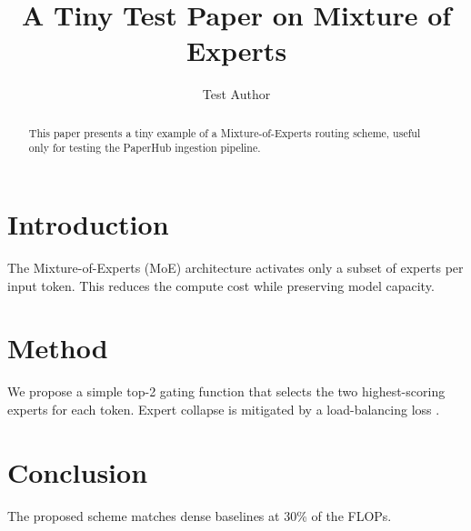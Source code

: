 \documentclass{article}
\title{A Tiny Test Paper on Mixture of Experts}
\author{Test Author}
\begin{document}
\maketitle

\begin{abstract}
This paper presents a tiny example of a Mixture-of-Experts routing scheme,
useful only for testing the PaperHub ingestion pipeline.
\end{abstract}

\section{Introduction}
The Mixture-of-Experts (MoE) architecture activates only a subset of experts
per input token. This reduces the compute cost while preserving model capacity.

\section{Method}
We propose a simple top-2 gating function that selects the two highest-scoring
experts for each token. Expert collapse is mitigated by a load-balancing loss
\cite{shazeer2017}.

\section{Conclusion}
The proposed scheme matches dense baselines at 30\% of the FLOPs.



\end{document}

